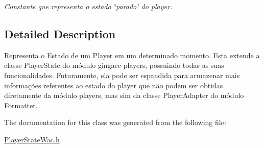 \begin{DoxyCompactItemize}
\begin{DoxyCompactList}\small\item\em Constante que representa o estado \char`\"{}parado\char`\"{} do player. \item\end{DoxyCompactList}\end{DoxyCompactItemize}


\subsection{Detailed Description}
Representa o Estado de um Player em um determinado momento. Esta extende a classe PlayerState do módulo gingacc-\/players, possuindo todas as suas funcionalidades. Futuramente, ela pode ser espandida para armazenar mais informações referentes ao estado do player que não podem ser obtidas diretamente da módulo players, mas sim da classe PlayerAdapter do módulo Formatter. 

The documentation for this class was generated from the following file:\begin{DoxyCompactItemize}
\item 
\hyperlink{PlayerStateWac_8h}{PlayerStateWac.h}\end{DoxyCompactItemize}
